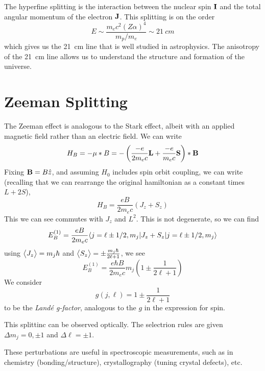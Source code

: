 The hyperfine splitting is the interaction between the nuclear spin \(\mathbf{I}\) and the total angular momentum of the electron \(\mathbf{J}\). This splitting is on the order 
\[E\sim \frac{m_ec^2(Z\alpha)^4}{m_p/m_e}\sim \SI{21}{cm}\]
which gives us the \SI{21}{cm} line that is well studied in astrophysics. The anisotropy of the \SI{21}{cm} line allows us to understand the structure and formation of the universe.

\section{Zeeman Splitting}
The Zeeman effect is analogous to the Stark effect, albeit with an applied magnetic field rather than an electric field. We can write
\begin{equation}
	H_B = -\mu*B = -\left(\frac{-e}{2m_ec}\mathbf{L} + \frac{-e}{m_ec}\mathbf{S}\right)*\mathbf{B}
\end{equation}
Fixing \(\mathbf{B} = B\hat z\), and assuming \(H_0\) includes spin orbit coupling, we can write (recalling that we can rearrange the original hamiltonian as a constant times \(L+2S\)),
\[H_B = \frac{eB}{2m_ec}(J_z+S_z)\]
This we can see commutes with \(J_z\) and \(L^2\). This is not degenerate, so we can  find
\[E_B^{(1)} = \frac{eB}{2m_ec}\langle j=\ell\pm 1/2,m_j\rvert J_z+S_z\lvert j=\ell\pm 1/2,m_j\rangle\]
using \(\left\langle \begin{matrix}J_z\end{matrix} \right\rangle = m_j\hbar\) and \(\left\langle \begin{matrix}S_z\end{matrix} \right\rangle = \pm\frac{m_j\hbar}{2\ell+1}\), we see
\[E_B^{(1)} = \frac{e\hbar B}{2m_ec}m_j \left(1\pm\frac{1}{2\ell+1}\right)\]
We consider 
\[g(j,\ell) = 1\pm\frac{1}{2\ell+1}\]
to be the \emph{Land\'e g-factor}, analogous to the \(g\) in the expression for spin.

This splittinc can be observed optically. The selectrion rules are given \(\Delta m_j = 0,\pm 1\) and \(\Delta\ell = \pm 1\).

These perturbations are useful in spectroscopic measurements, such as in chemistry (bonding/structure), crystallography (tuning crystal defects), etc.
